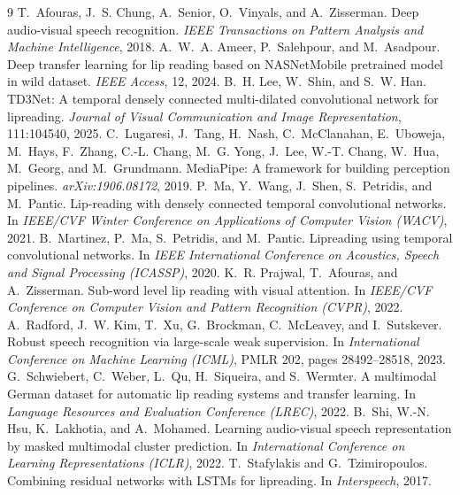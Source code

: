 \documentclass[10pt, a4paper]{article}
\begin{document}
\begin{thebibliography}{9}
T.~Afouras, J.~S. Chung, A.~Senior, O.~Vinyals, and A.~Zisserman.
\newblock Deep audio-visual speech recognition.
\newblock \emph{IEEE Transactions on Pattern Analysis and Machine Intelligence}, 2018.
A.~W.~A. Ameer, P.~Salehpour, and M.~Asadpour.
\newblock Deep transfer learning for lip reading based on NASNetMobile pretrained model in wild dataset.
\newblock \emph{IEEE Access}, 12, 2024.
B.~H. Lee, W.~Shin, and S.~W. Han.
\newblock TD3Net: A temporal densely connected multi-dilated convolutional network for lipreading.
\newblock \emph{Journal of Visual Communication and Image Representation}, 111:104540, 2025.
C.~Lugaresi, J.~Tang, H.~Nash, C.~McClanahan, E.~Uboweja, M.~Hays, F.~Zhang, C.-L. Chang, M.~G. Yong, J.~Lee, W.-T. Chang, W.~Hua, M.~Georg, and M.~Grundmann.
\newblock MediaPipe: A framework for building perception pipelines.
\newblock \emph{arXiv:1906.08172}, 2019.
P.~Ma, Y.~Wang, J.~Shen, S.~Petridis, and M.~Pantic.
\newblock Lip-reading with densely connected temporal convolutional networks.
\newblock In \emph{IEEE/CVF Winter Conference on Applications of Computer Vision (WACV)}, 2021.
B.~Martinez, P.~Ma, S.~Petridis, and M.~Pantic.
\newblock Lipreading using temporal convolutional networks.
\newblock In \emph{IEEE International Conference on Acoustics, Speech and Signal Processing (ICASSP)}, 2020.
K.~R. Prajwal, T.~Afouras, and A.~Zisserman.
\newblock Sub-word level lip reading with visual attention.
\newblock In \emph{IEEE/CVF Conference on Computer Vision and Pattern Recognition (CVPR)}, 2022.
A.~Radford, J.~W. Kim, T.~Xu, G.~Brockman, C.~McLeavey, and I.~Sutskever.
\newblock Robust speech recognition via large-scale weak supervision.
\newblock In \emph{International Conference on Machine Learning (ICML)}, PMLR 202, pages 28492--28518, 2023.
G.~Schwiebert, C.~Weber, L.~Qu, H.~Siqueira, and S.~Wermter.
\newblock A multimodal German dataset for automatic lip reading systems and transfer learning.
\newblock In \emph{Language Resources and Evaluation Conference (LREC)}, 2022.
B.~Shi, W.-N. Hsu, K.~Lakhotia, and A.~Mohamed.
\newblock Learning audio-visual speech representation by masked multimodal cluster prediction.
\newblock In \emph{International Conference on Learning Representations (ICLR)}, 2022.
T.~Stafylakis and G.~Tzimiropoulos.
\newblock Combining residual networks with LSTMs for lipreading.
\newblock In \emph{Interspeech}, 2017.
\end{thebibliography}
\end{document}
